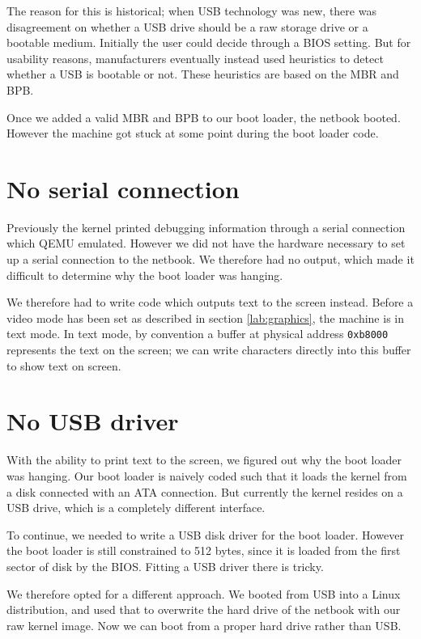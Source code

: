 \documentclass{report}
\begin{document}
The reason for this is historical; when USB technology was new, there was
disagreement on whether a USB drive should be a raw storage drive or a
bootable medium. Initially the user could decide through a BIOS setting. But
for usability reasons, manufacturers eventually instead used heuristics to
detect whether a USB is bootable or not. These heuristics are based on the
MBR and BPB.

Once we added a valid MBR and BPB to our boot loader, the netbook booted.
However the machine got stuck at some point during the boot loader code.


\section{No serial connection}
Previously the kernel printed debugging information through a serial
connection which QEMU emulated. However we did not have the hardware necessary
to set up a serial connection to the netbook. We therefore had no output,
which made it difficult to determine why the boot loader was hanging.

We therefore had to write code which outputs text to the screen instead.
Before a video mode has been set as described in section \ref{lab:graphics},
the machine is in text mode. In text mode, by convention a buffer at physical
address \texttt{0xb8000} represents the text on the screen; we can write characters
directly into this buffer to show text on screen.


\section{No USB driver}
With the ability to print text to the screen, we figured out why the boot
loader was hanging. Our boot loader is naively coded such that it loads the
kernel from a disk connected with an ATA connection. But currently the kernel
resides on a USB drive, which is a completely different interface.

To continue, we needed to write a USB disk driver for the boot loader. However
the boot loader is still constrained to 512 bytes, since it is loaded from the
first sector of disk by the BIOS. Fitting a USB driver there is tricky.

We therefore opted for a different approach. We booted from USB into a Linux
distribution, and used that to overwrite the hard drive of the netbook with
our raw kernel image. Now we can boot from a proper hard drive rather than
USB.
\end{document}
